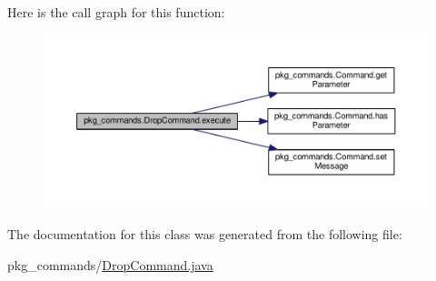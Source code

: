 Here is the call graph for this function\-:
\nopagebreak
\begin{figure}[H]
\begin{center}
\leavevmode
\includegraphics[width=350pt]{classpkg__commands_1_1DropCommand_a742e37b2d2dd4e111130811ee2f4dd0b_cgraph}
\end{center}
\end{figure}




The documentation for this class was generated from the following file\-:\begin{DoxyCompactItemize}
\item 
pkg\-\_\-commands/\hyperlink{DropCommand_8java}{Drop\-Command.\-java}\end{DoxyCompactItemize}
